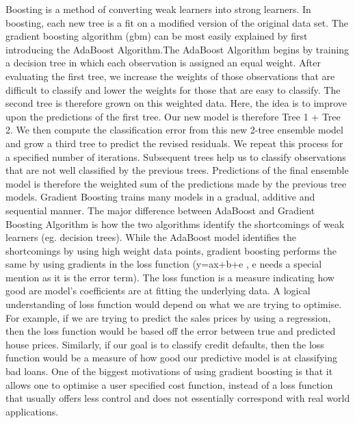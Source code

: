 \documentclass[12pt]{article}
\begin{document}

Boosting is a method of converting weak learners into strong learners. In boosting, each new tree is a fit on a modified version of the original data set. The gradient boosting algorithm (gbm) can be most easily explained by first introducing the AdaBoost Algorithm.The AdaBoost Algorithm begins by training a decision tree in which each observation is assigned an equal weight. After evaluating the first tree, we increase the weights of those observations that are difficult to classify and lower the weights for those that are easy to classify. The second tree is therefore grown on this weighted data. Here, the idea is to improve upon the predictions of the first tree. Our new model is therefore Tree 1 + Tree 2. We then compute the classification error from this new 2-tree ensemble model and grow a third tree to predict the revised residuals. We repeat this process for a specified number of iterations. Subsequent trees help us to classify observations that are not well classified by the previous trees. Predictions of the final ensemble model is therefore the weighted sum of the predictions made by the previous tree models.
Gradient Boosting trains many models in a gradual, additive and sequential manner. The major difference between AdaBoost and Gradient Boosting Algorithm is how the two algorithms identify the shortcomings of weak learners (eg. decision trees). While the AdaBoost model identifies the shortcomings by using high weight data points, gradient boosting performs the same by using gradients in the loss function (y=ax+b+e , e needs a special mention as it is the error term). The loss function is a measure indicating how good are model’s coefficients are at fitting the underlying data. A logical understanding of loss function would depend on what we are trying to optimise. For example, if we are trying to predict the sales prices by using a regression, then the loss function would be based off the error between true and predicted house prices. Similarly, if our goal is to classify credit defaults, then the loss function would be a measure of how good our predictive model is at classifying bad loans. One of the biggest motivations of using gradient boosting is that it allows one to optimise a user specified cost function, instead of a loss function that usually offers less control and does not essentially correspond with real world applications.
\end{document}
